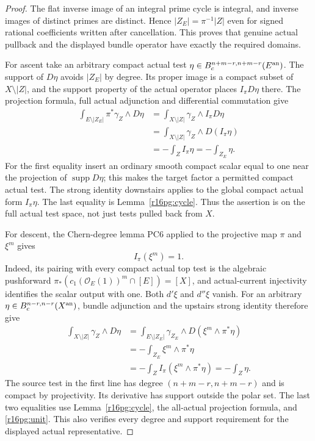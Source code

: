 \documentclass[11pt,a4paper]{article}
\theoremstyle{definition}
\theoremstyle{remark}
\numberwithin{equation}{section}
\begin{document}
\begin{proof}
The flat inverse image of an integral prime cycle is integral,
and inverse images of distinct primes are distinct. Hence
$|Z_E|=\pi^{-1}|Z|$ even for signed rational coefficients written
after cancellation. This proves that genuine actual pullback and
the displayed bundle operator have exactly the required domains.

For ascent take an arbitrary compact actual test
$\eta\in B_c^{n+m-r,n+m-r}(E^{\rm an})$. The support of $D\eta$
avoids $|Z_E|$ by degree. Its proper image is a compact subset of
$X\setminus|Z|$, and the support property of the actual operator
places $I_\pi D\eta$ there. The projection formula, full actual
adjunction and differential commutation give
\[
 \begin{split}
 \int_{E\setminus|Z_E|}\pi^*\gamma_Z\wedge D\eta
   &=\int_{X\setminus|Z|}\gamma_Z\wedge I_\pi D\eta\\
   &=\int_{X\setminus|Z|}\gamma_Z\wedge D(I_\pi\eta)\\
   &=-\int_Z I_\pi\eta
    =-\int_{Z_E}\eta.
 \end{split}
 \tag{PG16.7}\label{r16pg:ascent-pairing}
\]
For the first equality insert an ordinary smooth compact scalar
equal to one near the projection of $\operatorname{supp}D\eta$;
this makes the target factor a permitted compact actual test.
The strong identity downstairs applies to the global compact
actual form $I_\pi\eta$. The last equality is
Lemma~\ref{r16pg:cycle}. Thus the assertion is on the full actual
test space, not just tests pulled back from $X$.

For descent, the Chern-degree lemma PC6 applied to the
projective map $\pi$ and $\xi^m$ gives
\[
                             I_\pi(\xi^m)=1.
 \tag{PG16.8}\label{r16pg:unit}
\]
Indeed, its pairing with every compact actual top test is the
algebraic pushforward
$\pi_*(c_1(\mathcal O_E(1))^m\cap[E])=[X]$, and actual-current
injectivity identifies the scalar output with one. Both $d'\xi$
and $d''\xi$ vanish. For an arbitrary
$\eta\in B_c^{n-r,n-r}(X^{\rm an})$, bundle adjunction and the
upstairs strong identity therefore give
\[
 \begin{split}
 \int_{X\setminus|Z|}\gamma_Z\wedge D\eta
   &=\int_{E\setminus|Z_E|}\gamma_{Z_E}
                                  \wedge D(\xi^m\wedge\pi^*\eta)\\
   &=-\int_{Z_E}\xi^m\wedge\pi^*\eta\\
   &=-\int_Z I_\pi(\xi^m\wedge\pi^*\eta)
    =-\int_Z\eta.
 \end{split}
 \tag{PG16.9}\label{r16pg:descent-pairing}
\]
The source test in the first line has degree
$(n+m-r,n+m-r)$ and is compact by projectivity. Its derivative
has support outside the polar set. The last two equalities use
Lemma~\ref{r16pg:cycle}, the all-actual projection formula, and
\eqref{r16pg:unit}. This also verifies every degree and support
requirement for the displayed actual representative.
\end{proof}
\end{document}
